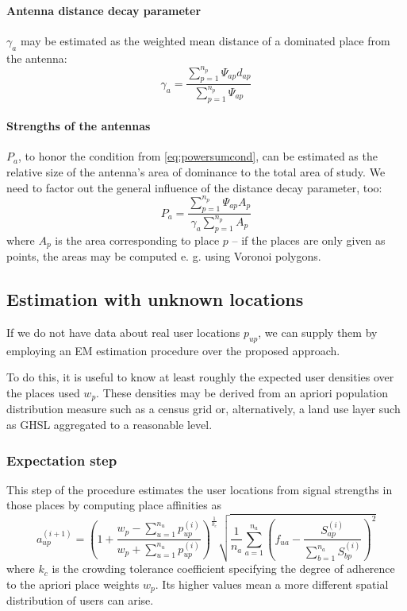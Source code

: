 \documentclass[a4paper]{article}
\begin{document}
\paragraph{Antenna distance decay parameter} $\gamma_a$ may be estimated as
the weighted mean distance of a dominated place from the antenna:
\begin{equation}
\gamma_a = \frac
    {\sum_{p=1}^{n_p} \Psi_{ap} d_{ap}}
    {\sum_{p=1}^{n_p} \Psi_{ap}}
\end{equation}

\paragraph{Strengths of the antennas} $P_a$, to honor the condition from
\eqref{eq:powersumcond}, can be estimated as the relative size of the antenna's
area of dominance to the total area of study. We need to factor out the
general influence of the distance decay parameter, too:
\begin{equation}
P_a = \frac
    {\sum_{p=1}^{n_p} \Psi_{ap} A_p}
    {\gamma_a \sum_{p=1}^{n_p} A_p}
\end{equation}
where $A_p$ is the area corresponding to place $p$ -- if the places are only
given as points, the areas may be computed e. g. using Voronoi polygons.


\subsection{Estimation with unknown locations}
If we do not have data about real user locations $p_{up}$, we can supply them by
employing an EM estimation procedure over the proposed approach.

To do this, it is useful to know at least roughly the expected user densities
over the places used $w_p$. These densities may be derived from an apriori
population distribution measure such as a census grid or, alternatively, a land
use layer such as GHSL aggregated to a reasonable level.

\subsubsection{Expectation step}
This step of the procedure estimates the user locations
from signal strengths in those places by computing place affinities as
\begin{equation}
a_{up}^{(i+1)} = \left(
    1 + \frac
        {w_p - \sum_{u=1}^{n_u} p_{up}^{(i)}}
        {w_p + \sum_{u=1}^{n_u} p_{up}^{(i)}}
\right)^{\frac{1}{k_c}}
\sqrt{
    \frac{1}{n_a} \sum_{a=1}^{n_a} \left(
        f_{ua} - \frac{S_{ap}^{(i)}}{\sum_{b=1}^{n_a} S_{bp}^{(i)}}
    \right)^2
}
\end{equation}
where $k_c$ is the crowding tolerance coefficient specifying the degree of
adherence to the apriori place weights $w_p$. Its higher values mean a more
different spatial distribution of users can arise.
\end{document}
